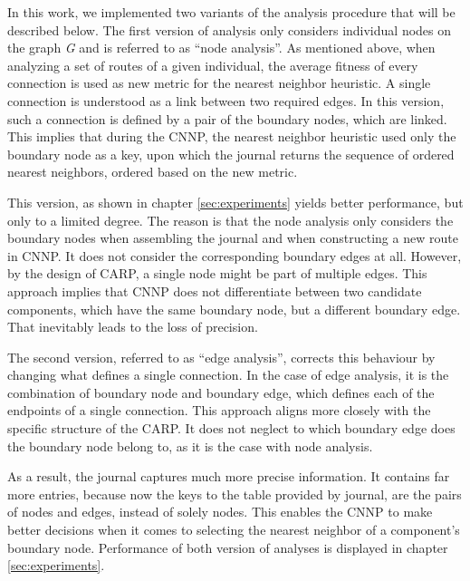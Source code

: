 \documentclass[twoside]{ctuthesis}
\theoremstyle{plain}
\theoremstyle{definition}
\theoremstyle{note}
\begin{document}
In this work, we implemented two variants of the analysis procedure that will be described below.
The first version of analysis only considers individual nodes on the graph \emph{G} and is referred to as ``node analysis''. As mentioned above, when analyzing a set of routes of a given individual, the average fitness of every connection is used as new metric for the nearest neighbor heuristic. A single connection is understood as a link between two required edges. 
In this version, such a connection is defined by a pair of the boundary nodes, which are linked. This implies that during the CNNP, the nearest neighbor heuristic used only the boundary node as a key, upon which the journal returns the sequence of ordered nearest neighbors, ordered based on the new metric.

This version, as shown in chapter \ref{sec:experiments} yields better performance, but only to a limited degree. The reason is that the node analysis only considers the boundary nodes when assembling the journal and when constructing a new route in CNNP. It does not consider the corresponding boundary edges at all. However, by the design of CARP, a single node might be part of multiple edges. This approach implies that CNNP does not differentiate between two candidate components, which have the same boundary node, but a different boundary edge. That inevitably leads to the loss of precision.

The second version, referred to as ``edge analysis'', corrects this behaviour by changing what defines a single connection. In the case of edge analysis, it is the combination of boundary node and boundary edge, which defines each of the endpoints of a single connection.
 This approach aligns more closely with the specific structure of the CARP. It does not neglect to which boundary edge does the boundary node belong to, as it is the case with node analysis.

As a result, the journal captures much more precise information. It contains far more entries, because now the keys to the table provided by journal, are the pairs of nodes and edges, instead of solely nodes. 
This enables the CNNP to make better decisions when it comes to selecting the nearest neighbor of a component's boundary node.
Performance of both version of analyses is displayed in chapter \ref{sec:experiments}.


%
\end{document}
